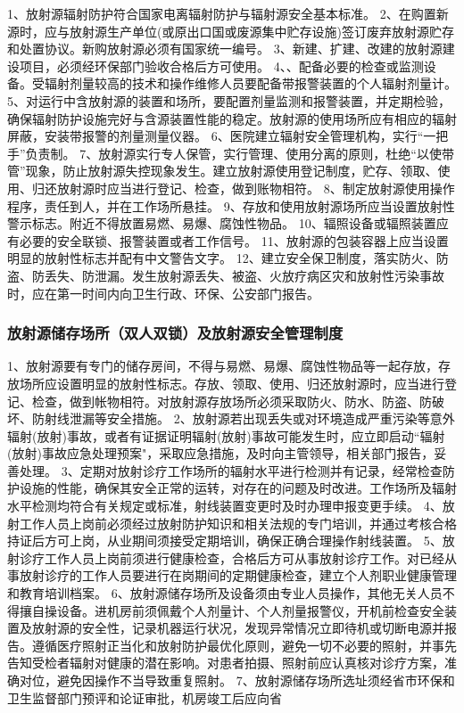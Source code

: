 1、放射源辐射防护符合国家电离辐射防护与辐射源安全基本标准。
2、在购置新源时，应与放射源生产单位(或原出口国或废源集中贮存设施)签订废弃放射源贮存和处置协议。新购放射源必须有国家统一编号。
3、新建、扩建、改建的放射源建设项目，必须经环保部门验收合格后方可使用。
4、、配备必要的检查或监测设备。受辐射剂量较高的技术和操作维修人员要配备带报警装置的个人辐射剂量计。
5、对运行中含放射源的装置和场所，要配置剂量监测和报警装置，并定期检验，确保辐射防护设施完好与含源装置性能的稳定。放射源的使用场所应有相应的辐射屏蔽，安装带报警的剂量测量仪器。
6、医院建立辐射安全管理机构，实行“一把手”负责制。
7、放射源实行专人保管，实行管理、使用分离的原则，杜绝“以使带管”现象，防止放射源失控现象发生。建立放射源使用登记制度，贮存、领取、使用、归还放射源时应当进行登记、检查，做到账物相符。
8、制定放射源使用操作程序，责任到人，并在工作场所悬挂。
9、存放和使用放射源场所应当设置放射性警示标志。附近不得放置易燃、易爆、腐蚀性物品。
10、辐照设备或辐照装置应有必要的安全联锁、报警装置或者工作信号。
11、放射源的包装容器上应当设置明显的放射性标志并配有中文警告文字。
12、建立安全保卫制度，落实防火、防盗、防丢失、防泄漏。发生放射源丢失、被盗、火放疗病区灾和放射性污染事故时，应在第一时间内向卫生行政、环保、公安部门报告。

\subsubsection{放射源储存场所（双人双锁）及放射源安全管理制度}

1、放射源要有专门的储存房间，不得与易燃、易爆、腐蚀性物品等一起存放，存放场所应设置明显的放射性标志。存放、领取、使用、归还放射源时，应当进行登记、检查，做到帐物相符。对放射源存放场所必须采取防火、防水、防盗、防破坏、防射线泄漏等安全措施。
2、放射源若出现丢失或对环境造成严重污染等意外辐射(放射)事故，或者有证据证明辐射(放射)事故可能发生时，应立即启动“辐射(放射)事故应急处理预案"，采取应急措施，及时向主管领导，相关部门报告，妥善处理。
3、定期对放射诊疗工作场所的辐射水平进行检测并有记录，经常检查防护设施的性能，确保其安全正常的运转，对存在的问题及时改进。工作场所及辐射水平检测均符合有关规定或标准，射线装置变更时及时办理申报变更手续。
4、放射工作人员上岗前必须经过放射防护知识和相关法规的专门培训，并通过考核合格持证后方可上岗，从业期间须接受定期培训，确保正确合理操作射线装置。
5、放射诊疗工作人员上岗前须进行健康检查，合格后方可从事放射诊疗工作。对已经从事放射诊疗的工作人员要进行在岗期间的定期健康检查，建立个人剂职业健康管理和教育培训档案。
6、放射源储存场所及设备须由专业人员操作，其他无关人员不得攘自操设备。进机房前须佩戴个人剂量计、个人剂量报警仪，开机前检查安全装置及放射源的安全性，记录机器运行状况，发现异常情况立即待机或切断电源并报告。遵循医疗照射正当化和放射防护最优化原则，避免一切不必要的照射，并事先告知受检者辐射对健康的潜在影响。对患者拍摄、照射前应认真核对诊疗方案，准确对位，避免因操作不当导致重复照射。
7、放射源储存场所选址须经省市环保和卫生监督部门预评和论证审批，机房竣工后应向省

